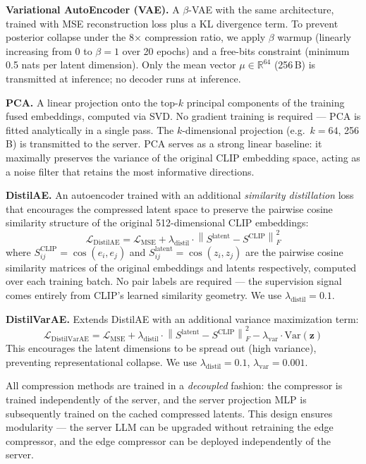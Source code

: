 \textbf{Variational AutoEncoder (VAE).} A $\beta$-VAE with the same architecture, trained with MSE reconstruction loss plus a KL divergence term. To prevent posterior collapse under the 8$\times$ compression ratio, we apply $\beta$ warmup (linearly increasing from 0 to $\beta{=}1$ over 20 epochs) and a free-bits constraint (minimum 0.5 nats per latent dimension). Only the mean vector $\mu \in \mathbb{R}^{64}$ (256\,B) is transmitted at inference; no decoder runs at inference.

\textbf{PCA.} A linear projection onto the top-$k$ principal components of the training fused embeddings, computed via SVD. No gradient training is required — PCA is fitted analytically in a single pass. The $k$-dimensional projection (e.g.\ $k{=}64$, 256\,B) is transmitted to the server. PCA serves as a strong linear baseline: it maximally preserves the variance of the original CLIP embedding space, acting as a noise filter that retains the most informative directions.

\textbf{DistilAE.} An autoencoder trained with an additional \emph{similarity distillation} loss that encourages the compressed latent space to preserve the pairwise cosine similarity structure of the original 512-dimensional CLIP embeddings:
\begin{equation}
    \mathcal{L}_{\text{DistilAE}} = \mathcal{L}_{\text{MSE}} + \lambda_{\text{distil}} \cdot \left\| S^{\text{latent}} - S^{\text{CLIP}} \right\|_F^2
\end{equation}
where $S^{\text{CLIP}}_{ij} = \cos(e_i, e_j)$ and $S^{\text{latent}}_{ij} = \cos(z_i, z_j)$ are the pairwise cosine similarity matrices of the original embeddings and latents respectively, computed over each training batch. No pair labels are required — the supervision signal comes entirely from CLIP's learned similarity geometry. We use $\lambda_{\text{distil}} = 0.1$.

\textbf{DistilVarAE.} Extends DistilAE with an additional variance maximization term:
\begin{equation}
    \mathcal{L}_{\text{DistilVarAE}} = \mathcal{L}_{\text{MSE}} + \lambda_{\text{distil}} \cdot \left\| S^{\text{latent}} - S^{\text{CLIP}} \right\|_F^2 - \lambda_{\text{var}} \cdot \text{Var}(\mathbf{z})
\end{equation}
This encourages the latent dimensions to be spread out (high variance), preventing representational collapse. We use $\lambda_{\text{distil}} = 0.1$, $\lambda_{\text{var}} = 0.001$.

All compression methods are trained in a \emph{decoupled} fashion: the compressor is trained independently of the server, and the server projection MLP is subsequently trained on the cached compressed latents. This design ensures modularity — the server LLM can be upgraded without retraining the edge compressor, and the edge compressor can be deployed independently of the server.

